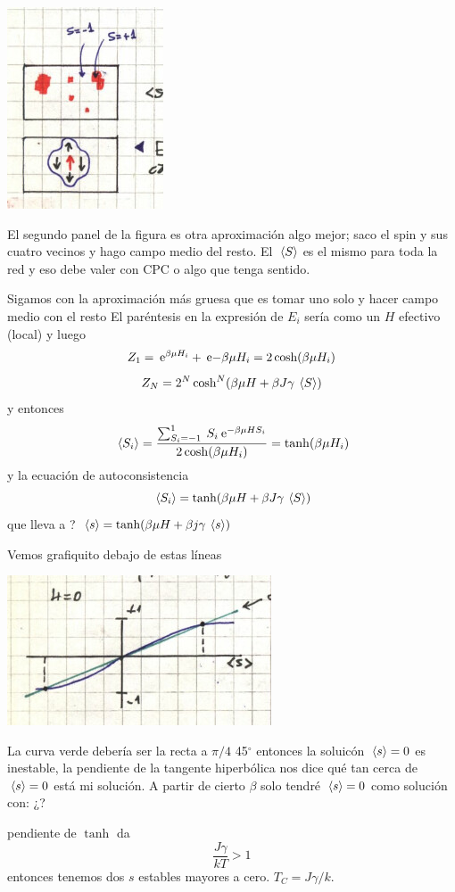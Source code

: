 \documentclass[10pt,oneside]{CBFT_book}
\begin{document}
\includegraphics[scale=0.5]{images/1606337155.jpg}

El segundo panel de la figura es otra aproximación algo mejor; saco el spin y sus cuatro vecinos y hago
campo medio del resto. El $\:\left\langle S \right\rangle$ es el mismo para toda la red y eso debe valer con CPC o algo que tenga
sentido.

Sigamos con la aproximación más gruesa que es tomar uno solo y hacer campo medio con el resto
El paréntesis en la expresión de $E_i$ sería como un $H$ efectivo (local) y luego
\[
	Z_1 = \:\mathrm{e}^{\beta\mu H_i } + \:\mathrm{e}{-\beta\mu H_i } = 2 \cosh( \beta\mu H_i )
\]
\[
	Z_N = 2^N \cosh^N( \beta\mu H + \beta J \gamma \:\left\langle S \right\rangle )
\]
y entonces
\[
	\:\left\langle S_i \right\rangle = \frac{ \sum_{S_i=-1}^1 \: S_i \:\mathrm{e}^{-\beta \mu H S_i } }{ 2 \cosh( \beta\mu H_i ) }
	= \tanh(\beta\mu H_i)
\]
y la ecuación de autoconsistencia
\[
	\:\left\langle S_i \right\rangle = \tanh( \beta\mu H + \beta J \gamma \:\left\langle S \right\rangle )
\]
que lleva a ? $\:\left\langle s \right\rangle = \tanh( \beta \mu H + \beta j \gamma \:\left\langle s \right\rangle)$

Vemos grafiquito debajo de estas líneas

\includegraphics[scale=0.5]{images/1606337159.jpg}

La curva verde debería ser la recta a $\pi/4$ 45$^\circ$ entonces la soluicón $\:\left\langle s \right\rangle=0$ es inestable, la 
pendiente de la tangente hiperbólica nos dice qué tan cerca de $\:\left\langle s \right\rangle=0$ está mi solución.
A partir de cierto $\beta$ solo tendré $\:\left\langle s \right\rangle=0$ como solución con: ¿?

pendiente de $\tanh$ da
\[
	\frac{J \gamma}{kT} > 1
\]
entonces tenemos dos $s$ estables mayores a cero. $T_C = J \gamma / k $.
\end{document}
